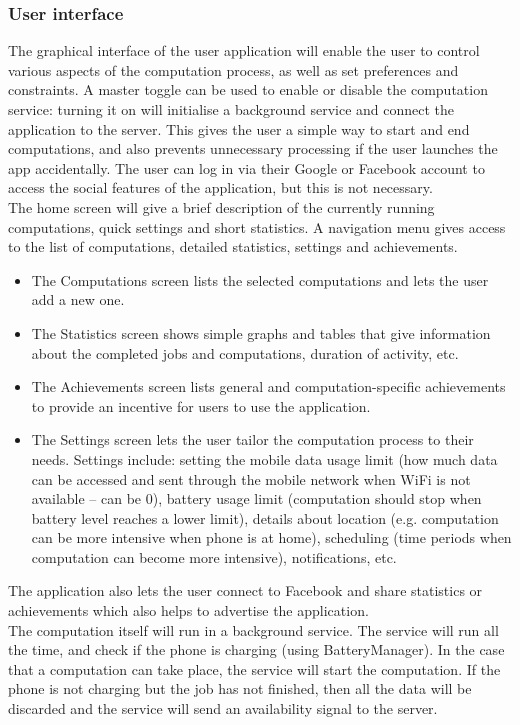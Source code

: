 \documentclass[a4paper,10pt]{article}
\begin{document}
\subsubsection{User interface}
The graphical interface of the user application will enable the user to control various aspects of the computation process, as well as set preferences and constraints. A master toggle can be used to enable or disable the computation service: turning it on will initialise a background service and connect the application to the server. This gives the user a simple way to start and end computations, and also prevents unnecessary processing if the user launches the app accidentally. The user can log in via their Google or Facebook account to access the social features of the application, but this is not necessary. \\
The home screen will give a brief description of the currently running computations, quick settings and short statistics. A navigation menu gives access to the list of computations, detailed statistics, settings and achievements. 
\begin{itemize}
    \item The Computations screen lists the selected computations and lets the user add a new one.
    \item The Statistics screen shows simple graphs and tables that give information about the completed jobs and computations, duration of activity, etc. 
    \item The Achievements screen lists general and computation-specific achievements to provide an incentive for users to use the application.
    \item The Settings screen lets the user tailor the computation process to their needs. Settings include: setting the mobile data usage limit (how much data can be accessed and sent through the mobile network when WiFi is not available – can be 0), battery usage limit (computation should stop when battery level reaches a lower limit), details about location (e.g. computation can be more intensive when phone is at home), scheduling (time periods when computation can become more intensive), notifications, etc.
\end{itemize}
The application also lets the user connect to Facebook and share statistics or achievements which also helps to advertise the application.\\
The computation itself will run in a background service. The service will run all the time, and check if the phone is charging (using BatteryManager). In the case that a computation can take place, the service will start the computation. If the phone is not charging but the job has not finished, then all the data will be discarded and the service will send an availability signal to the server.
\end{document}
